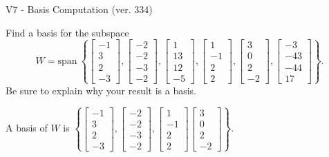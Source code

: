\begin{exercise}
  \begin{exerciseTitle}V7 - Basis Computation (ver. 334)\end{exerciseTitle}
  \begin{exerciseStatement}
    Find a basis for the subspace 
\[W=\mathrm{span}\ \left\{\left[\begin{array}{r}
-1 \\
3 \\
2 \\
-3
\end{array}\right] , \left[\begin{array}{r}
-2 \\
-2 \\
-3 \\
-2
\end{array}\right] , \left[\begin{array}{r}
1 \\
13 \\
12 \\
-5
\end{array}\right] , \left[\begin{array}{r}
1 \\
-1 \\
2 \\
2
\end{array}\right] , \left[\begin{array}{r}
3 \\
0 \\
2 \\
-2
\end{array}\right] , \left[\begin{array}{r}
-3 \\
-43 \\
-44 \\
17
\end{array}\right]\right\}.\]
 Be sure to explain why your result is a basis.


  \end{exerciseStatement}
  \begin{exerciseAnswer}
   A basis of \(W\) is  \(\left\{\left[\begin{array}{r}
-1 \\
3 \\
2 \\
-3
\end{array}\right] , \left[\begin{array}{r}
-2 \\
-2 \\
-3 \\
-2
\end{array}\right] , \left[\begin{array}{r}
1 \\
-1 \\
2 \\
2
\end{array}\right] \left[\begin{array}{r}
3 \\
0 \\
2 \\
-2
\end{array}\right]\right\}\).
  


  \end{exerciseAnswer}
\end{exercise}